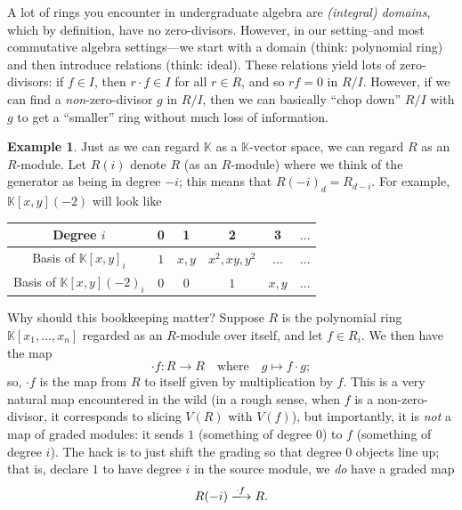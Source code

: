 \documentclass[12pt,a4paper]{article}
\newcommand{\KK}{\mathbb{K}}
\theoremstyle{definition}
\newtheorem{example}[theorem]{Example}
\numberwithin{equation}{section}
\begin{document}
A lot of rings you encounter in undergraduate algebra are \emph{(integral) domains}, which by definition, have no zero-divisors.
However, in our setting--and most commutative algebra settings---we start with a domain (think: polynomial ring) and then introduce relations (think: ideal).
These relations yield lots of zero-divisors: if $f \in I$, then $r \cdot f \in I$ for all $r \in R$, and so $rf = 0$ in $R/I$.
However, if we can find a \emph{non}-zero-divisor $g$ in $R/I$, then we can basically ``chop down'' $R/I$ with $g$ to get a ``smaller'' ring without much loss of information.

\begin{example}
    Just as we can regard $\KK$ as a $\KK$-vector space, we can regard $R$ as an $R$-module.
    Let $R(i)$ denote $R$ (as an $R$-module) where we think of the generator as being in degree $-i$; this means that $R(-i)_d = R_{d-i}$.
    For example, $\KK[x,y](-2)$ will look like
    \begin{center}
    {\renewcommand{\arraystretch}{1.5}
    \begin{tabular}{|c|c|c|c|c|c|}
        \hline
        Degree $i$ & 0 & 1 & 2 & 3 & $\dots$ \\
        \hline
        Basis of ${\KK[x,y]}_i$ & $1$ & $x, y$ & $x^2, xy, y^2$ & $\dots$ & $\dots$ \\
        \hline
        Basis of ${\KK[x,y](-2)}_i$ & $0$ & $0$ & $1$ & $x, y$ & $\dots$ \\
        \hline
    \end{tabular}}
    \end{center}

    Why should this bookkeeping matter?
    Suppose $R$ is the polynomial ring $\KK[x_1,\dots,x_n]$ regarded as an $R$-module over itself, and let $f \in R_i$.
    We then have the map
    \begin{equation*}
        \cdot f \colon R \longrightarrow R \quad \text{where} \quad g \mapsto f \cdot g;
    \end{equation*}
    so, $\cdot f$ is the map from $R$ to itself given by multiplication by $f$.
    This is a very natural map encountered in the wild (in a rough sense, when $f$ is a non-zero-divisor, it corresponds to slicing $V(R)$ with $V(f)$), but importantly, it is \emph{not} a map of graded modules: it sends $1$ (something of degree $0$) to $f$ (something of degree $i$).
    The hack is to just shift the grading so that degree $0$ objects line up; that is, declare $1$ to have degree $i$ in the source module, we \emph{do} have a graded map
    \begin{equation*}
        R(-i) \xlongrightarrow[]{\cdot f} R.
    \end{equation*}
\end{example}
\end{document}
